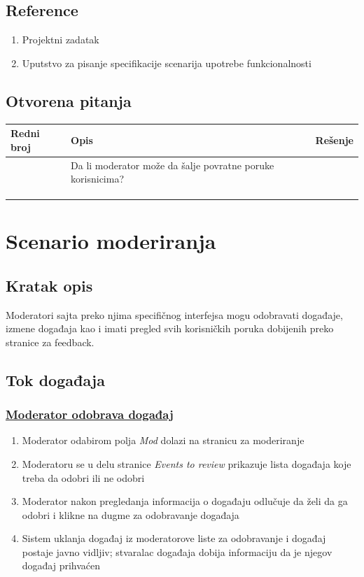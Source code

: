 \documentclass[11pt,a4paper]{article}
\begin{document}
\subsection{Reference}
\begin{enumerate}
    \item Projektni zadatak
    \item Uputstvo za pisanje specifikacije scenarija upotrebe funkcionalnosti
\end{enumerate}
\subsection{Otvorena pitanja}
\begin{center}
\begin{tabular}{| >{\centering\arraybackslash}m{1.9cm} | >{\centering\arraybackslash}m{4.9cm} | >{\centering\arraybackslash}m{4.9cm} |}
\hline
\rowcolor[HTML]{000000} 
{\color[HTML]{FFFFFF} Redni broj } & {\color[HTML]{FFFFFF} Opis } & {\color[HTML]{FFFFFF} Rešenje } \\ \hline
1 & Da li moderator može da šalje povratne poruke korisnicima? & \\ \hline
 &  &  \\ \hline
 &  &  \\ \hline
 &  &  \\ \hline
\end{tabular}
\end{center}

\newpage

\section{Scenario moderiranja}
\subsection{Kratak opis}
Moderatori sajta preko njima specifičnog interfejsa mogu odobravati događaje, izmene događaja kao i imati pregled svih korisničkih poruka dobijenih preko stranice za feedback.
\subsection{Tok događaja}
\subsubsection{\underline{Moderator odobrava događaj}}
\begin{enumerate}
    \item Moderator odabirom polja \textit{Mod} dolazi na stranicu za moderiranje
    \item Moderatoru se u delu stranice \textit{Events to review} prikazuje lista događaja koje treba da odobri ili ne odobri 
    \item Moderator nakon pregledanja informacija o događaju odlučuje da želi da ga odobri i klikne na dugme za odobravanje događaja
    \item Sistem uklanja događaj iz moderatorove liste za odobravanje i događaj postaje javno vidljiv; stvaralac događaja dobija informaciju da je njegov događaj prihvaćen
\end{enumerate}
\end{document}

